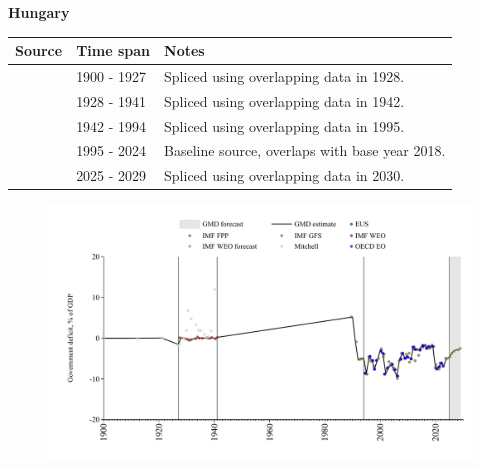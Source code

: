 \documentclass[12pt,a4paper,landscape]{article}
\begin{document}
\begin{adjustbox}{max totalsize={\paperwidth}{\paperheight},center}
\begin{minipage}[t][\textheight][t]{\textwidth}
\vspace*{0.5cm}
{}
\begin{center}
{\Large\bfseries Hungary}
\end{center}
\vspace{0.5cm}
\begin{table}[H]
\centering
\small
\begin{tabular}{|l|l|l|}
\hline
\textbf{Source} & \textbf{Time span} & \textbf{Notes} \\
\hline
\rowcolor{white}\cite{Mitchell}& 1900 - 1927 &Spliced using overlapping data in 1928.\\
\rowcolor{lightgray}\cite{IMF_FPP}& 1928 - 1941 &Spliced using overlapping data in 1942.\\
\rowcolor{white}\cite{IMF_GFS}& 1942 - 1994 &Spliced using overlapping data in 1995.\\
\rowcolor{lightgray}\cite{EUS}& 1995 - 2024 &Baseline source, overlaps with base year 2018.\\
\rowcolor{white}\cite{IMF_WEO_forecast}& 2025 - 2029 &Spliced using overlapping data in 2030.\\
\hline
\end{tabular}
\end{table}
\begin{figure}[H]
\centering
\includegraphics[width=\textwidth,height=0.6\textheight,keepaspectratio]{graphs/HUN_govdef_GDP.pdf}
\end{figure}
\end{minipage}
\end{adjustbox}
\end{document}

